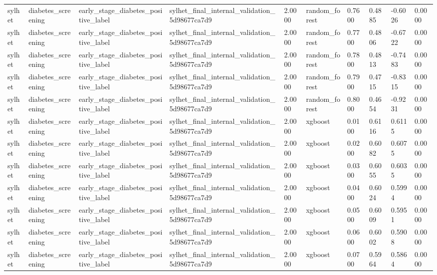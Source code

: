 \begin{tabular}{llllllllll}
sylhet & diabetes\_screening & early\_stage\_diabetes\_positive\_label & sylhet\_final\_internal\_validation\_5d98677ca7d9 & 2.0000 & random\_forest & 0.7600 & 0.4885 & -0.6026 & 0.0000 \\
sylhet & diabetes\_screening & early\_stage\_diabetes\_positive\_label & sylhet\_final\_internal\_validation\_5d98677ca7d9 & 2.0000 & random\_forest & 0.7700 & 0.4806 & -0.6722 & 0.0000 \\
sylhet & diabetes\_screening & early\_stage\_diabetes\_positive\_label & sylhet\_final\_internal\_validation\_5d98677ca7d9 & 2.0000 & random\_forest & 0.7800 & 0.4813 & -0.7483 & 0.0000 \\
sylhet & diabetes\_screening & early\_stage\_diabetes\_positive\_label & sylhet\_final\_internal\_validation\_5d98677ca7d9 & 2.0000 & random\_forest & 0.7900 & 0.4715 & -0.8315 & 0.0000 \\
sylhet & diabetes\_screening & early\_stage\_diabetes\_positive\_label & sylhet\_final\_internal\_validation\_5d98677ca7d9 & 2.0000 & random\_forest & 0.8000 & 0.4654 & -0.9231 & 0.0000 \\
sylhet & diabetes\_screening & early\_stage\_diabetes\_positive\_label & sylhet\_final\_internal\_validation\_5d98677ca7d9 & 2.0000 & xgboost & 0.0100 & 0.6116 & 0.6115 & 0.0000 \\
sylhet & diabetes\_screening & early\_stage\_diabetes\_positive\_label & sylhet\_final\_internal\_validation\_5d98677ca7d9 & 2.0000 & xgboost & 0.0200 & 0.6082 & 0.6075 & 0.0000 \\
sylhet & diabetes\_screening & early\_stage\_diabetes\_positive\_label & sylhet\_final\_internal\_validation\_5d98677ca7d9 & 2.0000 & xgboost & 0.0300 & 0.6055 & 0.6035 & 0.0000 \\
sylhet & diabetes\_screening & early\_stage\_diabetes\_positive\_label & sylhet\_final\_internal\_validation\_5d98677ca7d9 & 2.0000 & xgboost & 0.0400 & 0.6024 & 0.5994 & 0.0000 \\
sylhet & diabetes\_screening & early\_stage\_diabetes\_positive\_label & sylhet\_final\_internal\_validation\_5d98677ca7d9 & 2.0000 & xgboost & 0.0500 & 0.6009 & 0.5951 & 0.0000 \\
sylhet & diabetes\_screening & early\_stage\_diabetes\_positive\_label & sylhet\_final\_internal\_validation\_5d98677ca7d9 & 2.0000 & xgboost & 0.0600 & 0.6002 & 0.5908 & 0.0000 \\
sylhet & diabetes\_screening & early\_stage\_diabetes\_positive\_label & sylhet\_final\_internal\_validation\_5d98677ca7d9 & 2.0000 & xgboost & 0.0700 & 0.5964 & 0.5864 & 0.0000 \\

\end{tabular}
